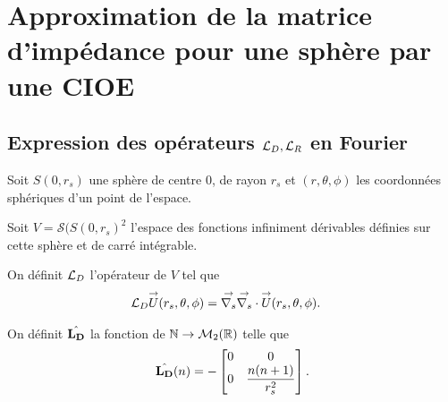 \section[Approximation par une CIOE de l'opérateur de Calderón de la sphère]{Approximation de la matrice d'impédance pour une sphère par une CIOE}

  \subsection[Expression des opérateurs LD,LR en Fourier]{Expression des opérateurs \({\mathcal{L}_D},{\mathcal{L}_R}\) en Fourier}


Soit \(S(0,r_s)\) une sphère de centre 0, de rayon \(r_s\) et \((r,\theta,\phi)\) les coordonnées sphériques d'un point de l'espace.

    Soit \(V = \mathcal{S}(S(0,r_s)^2\) l'espace des fonctions infiniment dérivables définies sur cette sphère et de carré intégrable.

    \begin{defn}
      \label{eq:sphere:fourier:LD}
      On définit \({\mathcal{L}_D}\) l'opérateur de \(V\) tel que
      \begin{align*}
        {\mathcal{L}_D} {\overset{\rightarrow}{U}}(r_s,\theta,\phi) & = {\overset{\rightarrow}{\nabla_s}}{} {\overset{\rightarrow}{\nabla_s}} \cdot{} {\overset{\rightarrow}{U}}(r_s,\theta,\phi).
      \end{align*}

      On définit \(\hat{\mathbf{L_D}}\) la fonction de \(\mathbb N \rightarrow \mathcal{M}_2(\mathbb R)\) telle que
      \begin{equation*}
        \hat{\mathbf{L_D}}(n) = -
        \begin{bmatrix}
          0 & 0
          \\
          0 & \dfrac{n(n+1)}{r_s^2}
        \end{bmatrix}.
      \end{equation*}
    \end{defn}

